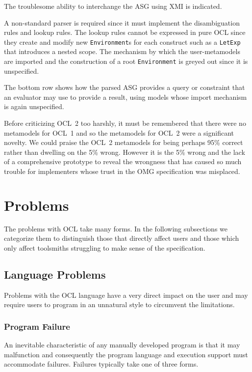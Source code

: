 \documentclass{jot}
\begin{document}
The troublesome ability to interchange the ASG using XMI is indicated.

A non-standard parser is required since it must implement the disambiguation rules and lookup rules. The lookup rules cannot be expressed in pure OCL since they create and modify new \verb$Environment$s for each construct such as a \verb$LetExp$ that introduces a nested scope. The mechanism by which the user-metamodels are imported and the construction of a root \verb$Environment$ is greyed out since it is unspecified.

The bottom row shows how the parsed ASG provides a query or constraint that an evaluator may use to provide a result, using models whose import mechanism is again unspecified.

Before criticizing OCL~2 too harshly, it must be remembered that there were no metamodels for OCL~1 and so the metamodels for OCL~2 were a significant novelty. We could praise the OCL~2 metamodels for being perhaps 95\% correct rather than dwelling on the 5\% wrong. However it is the 5\% wrong and the lack of a comprehensive prototype to reveal the wrongness that has caused so much trouble for implementers whose trust in the OMG specification was misplaced.

\section{Problems}\label{Problems}

The problems with OCL take many forms. In the following subsections we categorize them to distinguish those that directly affect users and those which only affect toolsmiths struggling to make sense of the specification.  

\subsection{Language Problems}

Problems with the OCL language have a very direct impact on the user and may require users to program in an unnatural style to circumvent the limitations.  

\subsubsection{Program Failure}

An inevitable characteristic of any manually developed program is that it may malfunction and consequently the program language and execution support must accommodate failures. Failures typically take one of three forms.
\end{document}
